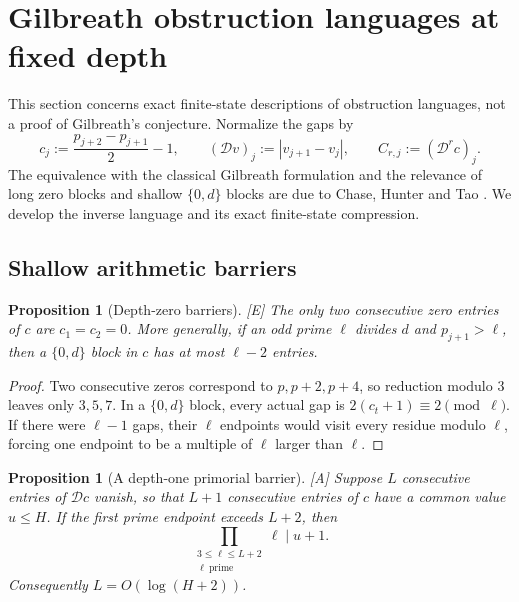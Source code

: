 \documentclass[11pt]{article}
\newtheorem{proposition}[theorem]{Proposition}
\theoremstyle{definition}
\theoremstyle{remark}
\newcommand{\Dabs}{\mathcal D}
\newcommand{\status}[1]{\textnormal{\textcolor{accent}{\footnotesize[#1]}}}
\begin{document}
\section{Gilbreath obstruction languages at fixed depth}

This section concerns exact finite-state descriptions of obstruction languages, not a
proof of Gilbreath's conjecture.  Normalize the gaps by
\begin{equation}\label{eq:Gilbreath-c}
 c_j:=\frac{p_{j+2}-p_{j+1}}2-1,
 \qquad (\Dabs v)_j:=|v_{j+1}-v_j|,
 \qquad C_{r,j}:=(\Dabs^rc)_j.
\end{equation}
The equivalence with the classical Gilbreath formulation and the relevance of long zero
blocks and shallow $\{0,d\}$ blocks are due to Chase, Hunter and Tao
\cite{CHT}.  We develop the inverse language and its exact finite-state compression.

\subsection{Shallow arithmetic barriers}

\begin{proposition}[Depth-zero barriers]\label{prop:depth-zero}
\status{E}
The only two consecutive zero entries of $c$ are $c_1=c_2=0$.  More generally, if an
odd prime $\ell$ divides $d$ and $p_{j+1}>\ell$, then a $\{0,d\}$ block in $c$ has at
most $\ell-2$ entries.
\end{proposition}

\begin{proof}
Two consecutive zeros correspond to $p,p+2,p+4$, so reduction modulo $3$ leaves only
$3,5,7$.  In a $\{0,d\}$ block, every actual gap is
$2(c_t+1)\equiv2\pmod\ell$.  If there were $\ell-1$ gaps, their $\ell$ endpoints would
visit every residue modulo $\ell$, forcing one endpoint to be a multiple of $\ell$ larger
than $\ell$.
\end{proof}

\begin{proposition}[A depth-one primorial barrier]\label{prop:depth-one}
\status{A}
Suppose $L$ consecutive entries of $\Dabs c$ vanish, so that $L+1$ consecutive entries
of $c$ have a common value $u\le H$.  If the first prime endpoint exceeds $L+2$, then
\begin{equation}\label{eq:primorial-barrier}
 \prod_{\substack{3\le\ell\le L+2\\\ell\ \mathrm{prime}}}\ell\mid u+1.
\end{equation}
Consequently $L=O(\log(H+2))$.
\end{proposition}
\end{document}
